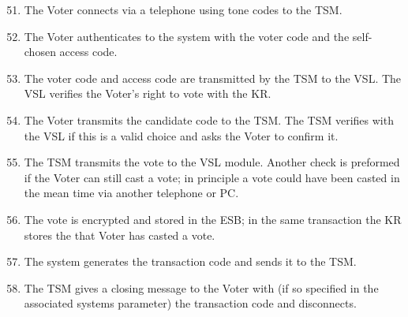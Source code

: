\begin{enumerate}
\setcounter{enumi}{50}
	\item The Voter connects via a telephone using tone codes to
	the TSM.

	\item The Voter authenticates to the system with the voter
	code and the self-chosen access code.

	\item The voter code and access code are transmitted by the
	TSM to the VSL. The VSL verifies the Voter's right to vote
	with the KR.

	\item The Voter transmits the candidate code to the TSM. The
	TSM verifies with the VSL if this is a valid choice and asks
	the Voter to confirm it.

	\item The TSM transmits the vote to the VSL module. Another
	check is preformed if the Voter can still cast a vote; in
	principle a vote could have been casted in the mean time via
	another telephone or PC.

	\item The vote is encrypted and stored in the ESB; in the same
	transaction the KR stores the that Voter has casted a vote.

	\item The system generates the transaction code and sends it
	to the TSM.

	\item The TSM gives a closing message to the Voter with (if so
	specified in the associated systems parameter) the transaction
	code and disconnects.


\end{enumerate}


